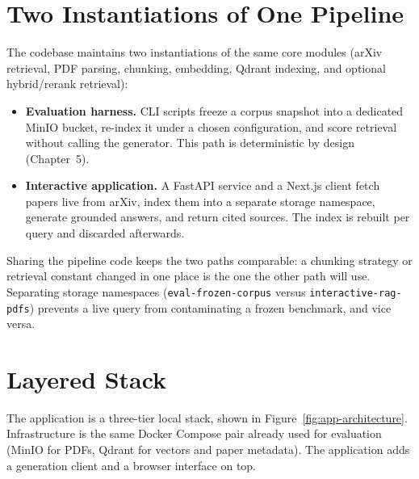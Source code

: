 \documentclass[12pt,a4paper,titlepage,oneside]{book}
\begin{document}
\section{Two Instantiations of One Pipeline}

The codebase maintains two instantiations of the same core modules (arXiv retrieval, PDF parsing, chunking, embedding, Qdrant indexing, and optional hybrid/rerank retrieval):

\begin{itemize}
    \item \textbf{Evaluation harness.} CLI scripts freeze a corpus snapshot into a dedicated MinIO bucket, re-index it under a chosen configuration, and score retrieval without calling the generator. This path is deterministic by design (Chapter~5).
    \item \textbf{Interactive application.} A FastAPI service and a Next.js client fetch papers live from arXiv, index them into a separate storage namespace, generate grounded answers, and return cited sources. The index is rebuilt per query and discarded afterwards.
\end{itemize}

Sharing the pipeline code keeps the two paths comparable: a chunking strategy or retrieval constant changed in one place is the one the other path will use. Separating storage namespaces (\texttt{eval-frozen-corpus} versus \texttt{interactive-rag-pdfs}) prevents a live query from contaminating a frozen benchmark, and vice versa.

\section{Layered Stack}

The application is a three-tier local stack, shown in Figure~\ref{fig:app-architecture}. Infrastructure is the same Docker Compose pair already used for evaluation (MinIO for PDFs, Qdrant for vectors and paper metadata). The application adds a generation client and a browser interface on top.
\end{document}
